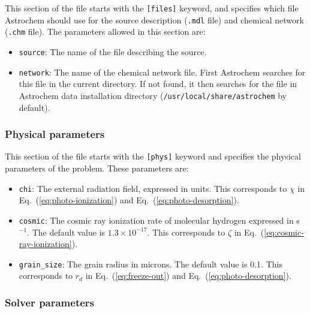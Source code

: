 \documentclass[a4paper,12pt]{article}
\begin{document}
This section of the file starts with the \verb=[files]= keyword, and
specifies which file Astrochem should use for the source description
(\verb=.mdl= file) and chemical network (\verb=.chm= file). The
parameters allowed in this section are:

\begin{itemize}

\item \verb=source=: The name of the file describing the source.

\item \verb=network=: The name of the chemical network file. First
  Astrochem searches for this file in the current directory. If not
  found, it then searches for the file in Astrochem data installation
  directory (\verb=/usr/local/share/astrochem= by default).

\end{itemize}

\subsubsection{Physical parameters}
\label{sec:physical-parameters}

This section of the file starts with the \verb=[phys]= keyword and
specifies the physical parameters of the problem. These parameters
are:

\begin{itemize}

\item \verb=chi=: The external radiation field, expressed in
  \citet{Habing68} units. This corresponds to $\chi$ in
  Eq.~(\ref{eq:photo-ionization}) and Eq.~(\ref{eq:photo-desorption}).

\item \verb=cosmic=: The cosmic ray ionization rate of molecular
  hydrogen expressed in s$^{-1}$. The default value is $1.3 \times
  10^{-17}$. This corresponds to $\zeta$ in
  Eq.~(\ref{eq:cosmic-ray-ionization}).

\item \verb=grain_size=: The grain radius in microns. The default
  value is 0.1. This corresponds to $r_{d}$ in
  Eq.~(\ref{eq:freeze-out}) and Eq.~(\ref{eq:photo-desorption}).

\end{itemize}

\subsubsection{Solver parameters}
\label{sec:solver-parameters}
\end{document}
